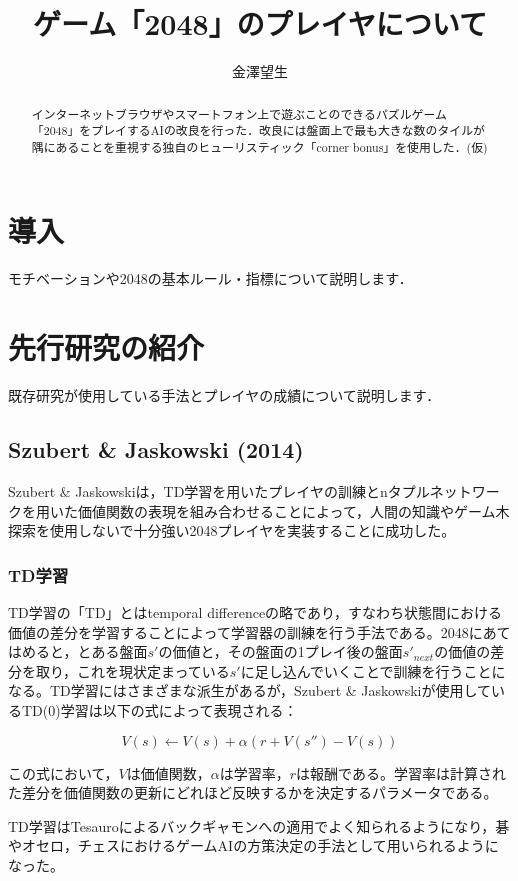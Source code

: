 \documentclass{suribt}
\title{ゲーム「2048」のプレイヤについて}
\author{金澤望生}
\begin{document}
\maketitle

\frontmatter
\begin{abstract}
インターネットブラウザやスマートフォン上で遊ぶことのできるパズルゲーム「2048」をプレイするAIの改良を行った．改良には盤面上で最も大きな数のタイルが隅にあることを重視する独自のヒューリスティック「corner bonus」を使用した．(仮)
\end{abstract}

\tableofcontents

\mainmatter
\chapter{導入}
モチベーションや2048の基本ルール・指標について説明します．

\chapter{先行研究の紹介}
既存研究が使用している手法とプレイヤの成績について説明します．

\section{Szubert \& Jaskowski (2014)}
Szubert \& Jaskowskiは，TD学習を用いたプレイヤの訓練とnタプルネットワークを用いた価値関数の表現を組み合わせることによって，人間の知識やゲーム木探索を使用しないで十分強い2048プレイヤを実装することに成功した。
\subsection{TD学習}
TD学習の「TD」とはtemporal differenceの略であり，すなわち状態間における価値の差分を学習することによって学習器の訓練を行う手法である。2048にあてはめると，とある盤面$s'$の価値と，その盤面の1プレイ後の盤面$s'_{next}$の価値の差分を取り，これを現状定まっている$s'$に足し込んでいくことで訓練を行うことになる。TD学習にはさまざまな派生があるが，Szubert \& Jaskowskiが使用しているTD(0)学習は以下の式によって表現される：

\[
	V(s) ← V(s) + \alpha (r + V(s'') - V(s) )
\]

この式において，$V$は価値関数，$\alpha$は学習率，$r$は報酬である。学習率は計算された差分を価値関数の更新にどれほど反映するかを決定するパラメータである。

TD学習はTesauroによるバックギャモンへの適用でよく知られるようになり，碁やオセロ，チェスにおけるゲームAIの方策決定の手法として用いられるようになった。
\end{document}
